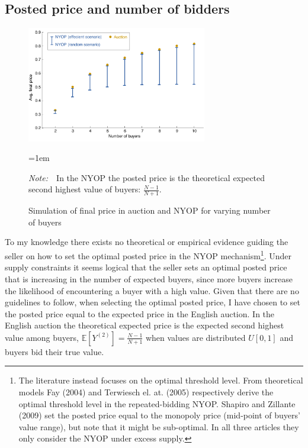 \documentclass[a4paper,12pt]{article}
\newcommand{\Figtext}[1]{%
	\begin{tablenotes}[para,flushleft]
		\hangindent=1em
		\footnotesize
		\raggedright
		#1
	\end{tablenotes}
}
\newcommand{\Fignote}[1]{\Figtext{\emph{Note:~}~#1}}
\begin{document}
	\subsection{Posted price and number of bidders}

	\begin{figure}
	        \centering
	        \caption{Simulation of final price in auction and NYOP for varying number of buyers}
	        \includegraphics[width=0.7\textwidth]{Figures/FinalPrice_Auction-NYOP}
			\label{fig:FinalPrice_Auction-NYOP}
			\Fignote{In the NYOP the posted price is the theoretical expected second highest value of buyers: $\frac{N-1}{N+1}$.}
	\end{figure}
	
	 To my knowledge there exists no theoretical or empirical evidence guiding the seller on how to set the optimal posted price in the NYOP mechanism\footnote{The literature instead focuses on the optimal threshold level. From theoretical models Fay (2004) and Terwiesch el. at. (2005) respectively derive the optimal threshold level in the repeated-bidding NYOP. Shapiro and Zillante (2009) set the posted price equal to the monopoly price (mid-point of buyers' value range), but note that it might be sub-optimal. In all three articles they only consider the NYOP under excess supply.}. Under supply constraints it seems logical that the seller sets an optimal posted price that is increasing in the number of expected buyers, since more buyers increase the likelihood of encountering a buyer with a high value. Given that there are no guidelines to follow, when selecting the optimal posted price, I have chosen to set the posted price equal to the expected price in the English auction. In the English auction the theoretical expected price is the expected second highest value among buyers, $\mathbb{E}[Y^{(2)}] = \frac{N-1}{N+1}$ when values are distributed $U[0,1]$ and buyers bid their true value.
\end{document}
